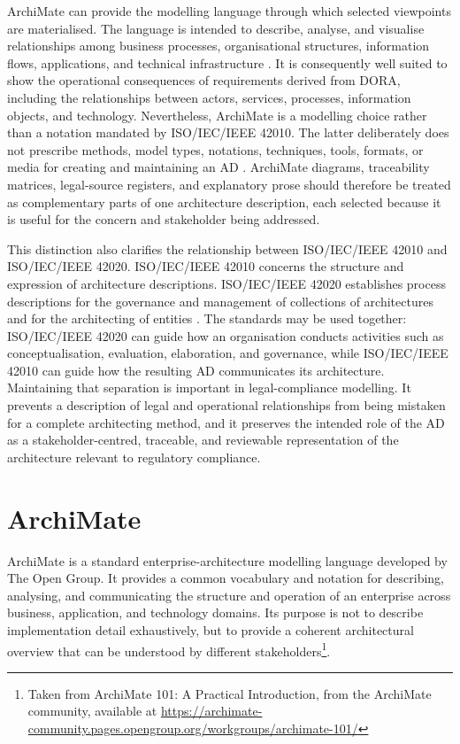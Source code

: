 ArchiMate can provide the modelling language through which selected viewpoints are materialised. The language is intended to describe, analyse, and visualise relationships among business processes, organisational structures, information flows, applications, and technical infrastructure \cite{opengroup}. It is consequently well suited to show the operational consequences of requirements derived from \ac{DORA}, including the relationships between actors, services, processes, information objects, and technology. Nevertheless, ArchiMate is a modelling choice rather than a notation mandated by ISO/IEC/IEEE 42010. The latter deliberately does not prescribe methods, model types, notations, techniques, tools, formats, or media for creating and maintaining an \ac{AD} \cite{ISO42010:2022}. ArchiMate diagrams, traceability matrices, legal-source registers, and explanatory prose should therefore be treated as complementary parts of one architecture description, each selected because it is useful for the concern and stakeholder being addressed.

This distinction also clarifies the relationship between ISO/IEC/IEEE 42010 and ISO/IEC/IEEE 42020. ISO/IEC/IEEE 42010 concerns the structure and expression of architecture descriptions. ISO/IEC/IEEE 42020 establishes process descriptions for the governance and management of collections of architectures and for the architecting of entities \cite{ISO42010:2022, ISO42020:2019}. The standards may be used together: ISO/IEC/IEEE 42020 can guide how an organisation conducts activities such as conceptualisation, evaluation, elaboration, and governance, while ISO/IEC/IEEE 42010 can guide how the resulting \ac{AD} communicates its architecture. Maintaining that separation is important in legal-compliance modelling. It prevents a description of legal and operational relationships from being mistaken for a complete architecting method, and it preserves the intended role of the AD as a stakeholder-centred, traceable, and reviewable representation of the architecture relevant to regulatory compliance.

\section{ArchiMate}

ArchiMate is a standard enterprise-architecture modelling language developed by The Open Group. It provides a common vocabulary and notation for describing, analysing, and communicating the structure and operation of an enterprise across business, application, and technology domains. Its purpose is not to describe implementation detail exhaustively, but to provide a coherent architectural overview that can be understood by different stakeholders\footnote{\label{fn:opengroup_archimate101}Taken from ArchiMate 101: A Practical Introduction, from the ArchiMate community, available at \url{https://archimate-community.pages.opengroup.org/workgroups/archimate-101/}}.

